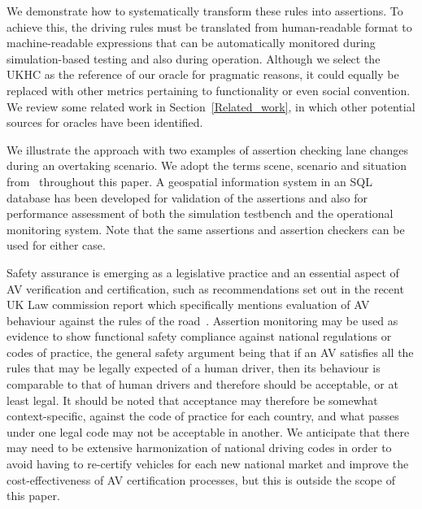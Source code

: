 %
We demonstrate how to systematically transform these rules into assertions. To achieve this, the driving rules must be translated from human-readable format to machine-readable expressions that can be automatically monitored during simulation-based testing and also during operation. Although we select the UKHC as the reference of our oracle for pragmatic reasons, it could equally be replaced with other metrics pertaining to functionality or even social convention. We review some related work in Section~\ref{Related_work}, in which other potential sources for oracles have been identified.
%
%

%
We illustrate the approach with two examples of assertion checking lane changes during an overtaking scenario. We adopt the terms scene, scenario and situation from~\cite{Ulbrich2015} throughout this paper. 
A geospatial information system in an SQL database has been developed for validation of the assertions and also for performance assessment of both the simulation testbench and the operational monitoring system. Note that the same assertions and assertion checkers can be used for either case.
%


Safety assurance is emerging as a legislative practice and an essential aspect of AV verification and certification, such as recommendations set out in the recent UK Law commission report which specifically mentions evaluation of AV behaviour against the rules of the road~\cite{law_commission_UK}. 
%
Assertion monitoring may be used as evidence to show functional safety compliance against national regulations or codes of practice, the general safety argument being that if an AV satisfies all the rules that may be legally expected of a human driver, then its behaviour is comparable to that of human drivers and therefore should be acceptable, or at least legal. It should be noted that acceptance may therefore be somewhat context-specific, against the code of practice for each country, and what passes under one legal code may not be acceptable in another. We anticipate that there may need to be extensive harmonization of national driving codes in order to avoid having to re-certify vehicles for each new national market and improve the cost-effectiveness of AV certification processes, but this is outside the scope of this paper.

